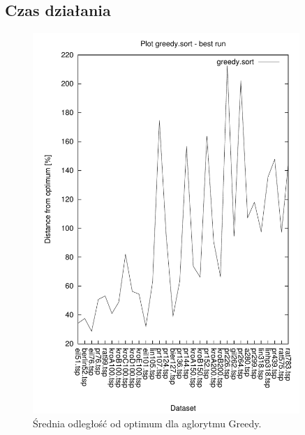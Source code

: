 \subsection{Czas działania}


\begin{figure}
\begin{center}
\includegraphics[width=0.9\textwidth]{wykresy/greedy_sort_best.pdf}
\end{center}
\caption{Średnia odległość od optimum dla aglorytmu Greedy.}
\label{fig-3d}
\end{figure}


